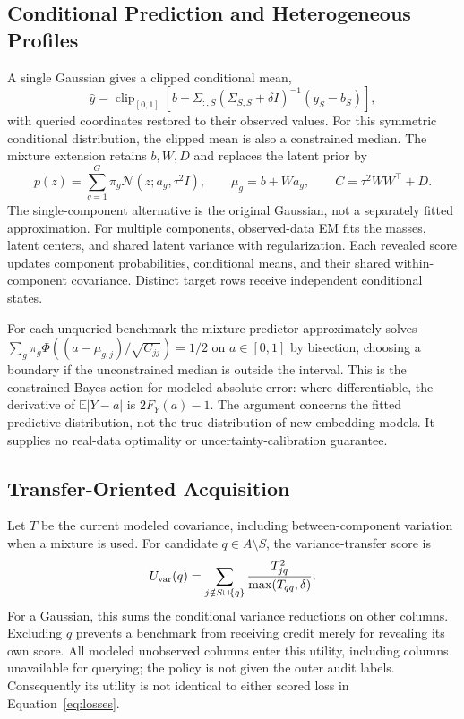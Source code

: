 \documentclass{article}
\begin{document}
\subsection{Conditional Prediction and Heterogeneous Profiles}
A single Gaussian gives a clipped conditional mean,
\begin{equation}
 \widehat y=\operatorname{clip}_{[0,1]}
 \left[b+\Sigma_{:,S}(\Sigma_{S,S}+\delta I)^{-1}(y_S-b_S)\right],
 \label{eq:gaussian}
\end{equation}
with queried coordinates restored to their observed values. For this symmetric conditional distribution, the clipped mean is also a constrained median. The mixture extension retains $b,W,D$ and replaces the latent prior by
\begin{equation}
 p(z)=\sum_{g=1}^{G}\pi_g\mathcal N(z;a_g,\tau^2I),\qquad
 \mu_g=b+Wa_g,\qquad C=\tau^2WW^\top+D.
 \label{eq:mixture}
\end{equation}
The single-component alternative is the original Gaussian, not a separately fitted approximation. For multiple components, observed-data EM fits the masses, latent centers, and shared latent variance with regularization. Each revealed score updates component probabilities, conditional means, and their shared within-component covariance. Distinct target rows receive independent conditional states.

For each unqueried benchmark the mixture predictor approximately solves
$\sum_g\pi_g\Phi((a-\mu_{g,j})/\sqrt{C_{jj}})=1/2$ on $a\in[0,1]$ by bisection, choosing a boundary if the unconstrained median is outside the interval. This is the constrained Bayes action for modeled absolute error: where differentiable, the derivative of $\mathbb E|Y-a|$ is $2F_Y(a)-1$. The argument concerns the fitted predictive distribution, not the true distribution of new embedding models. It supplies no real-data optimality or uncertainty-calibration guarantee.

\subsection{Transfer-Oriented Acquisition}
Let $T$ be the current modeled covariance, including between-component variation when a mixture is used. For candidate $q\in A\setminus S$, the variance-transfer score is
\begin{equation}
 U_{\rm var}(q)=\sum_{j\notin S\cup\{q\}}\frac{T_{jq}^2}{\max(T_{qq},\delta)}.
 \label{eq:transfer}
\end{equation}
For a Gaussian, this sums the conditional variance reductions on other columns. Excluding $q$ prevents a benchmark from receiving credit merely for revealing its own score. All modeled unobserved columns enter this utility, including columns unavailable for querying; the policy is not given the outer audit labels. Consequently its utility is not identical to either scored loss in Equation~\ref{eq:losses}.
\end{document}
